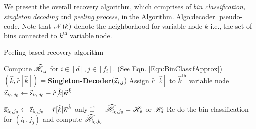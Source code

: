 	
We present the overall recovery algorithm, which comprises of {\it bin classification, singleton decoding} and {\it peeling process}, in the Algorithm.\ref{Algo:decoder} pseudo-code. Note that $\mathscr{N}(k)$ denote the neighborhood for variable node $k$  i.e., the set of bins connected to $k^{\text{th}}$ variable node.

\def\gap{4pt}
\begin{algorithm}[h!]
\caption{Peeling based recovery algorithm}
\label{Algo:decoder}
\begin{algorithmic}
\State Compute $\widehat{\mathscr{H}}_{i,j}$ for $i\in[d], j\in[f_i]$. (See Eqn. \eqref{Eqn:BinClassifApprox})
\vspace{\gap}
\vspace{\gap}
  \State $(\hat{k},\hat{r}[\hat{k}])=${\bf Singleton-Decoder}$(\vec{\mathrm{z}}_{i,j})$
\vspace{\gap}
  \State Assign $\hat{r}[\hat{k}]$ to $\hat{k}^{\text{th}}$ variable node
\vspace{1.5\gap}
\vspace{\gap}
	   \State $\vec{\mathrm{z}}_{i_0,j_0}\gets\vec{\mathrm{z}}_{i_0,j_0}-\hat{r}[\hat{k}]\vec{\mathrm{w}}^{\hat{k}}\hspace{5.5ex} $ \hspace{20.5ex} 
	   \vspace{\gap}
        \Else
         
        \State $\vec{\mathrm{z}}_{i_0,j_0}\gets\vec{\mathrm{z}}_{i_0,j_0}-\hat{r}[\hat{k}]\vec{\mathrm{w}}^{\hat{k}}$   \hspace{2ex} only if $~~~~\widehat{\mathscr{H}}_{i_0,j_0}=\mathscr{H}_s$ or $\mathscr{H}_d$ 	   
        \hspace{14ex} 
        \EndIf
	   \vspace{\gap}
	   \State Re-do the bin classification for $(i_0,j_0)$ and compute $\widehat{\mathscr{H}}_{i_0,j_0}$
      \EndFor
\EndWhile
\end{algorithmic}
\end{algorithm}

